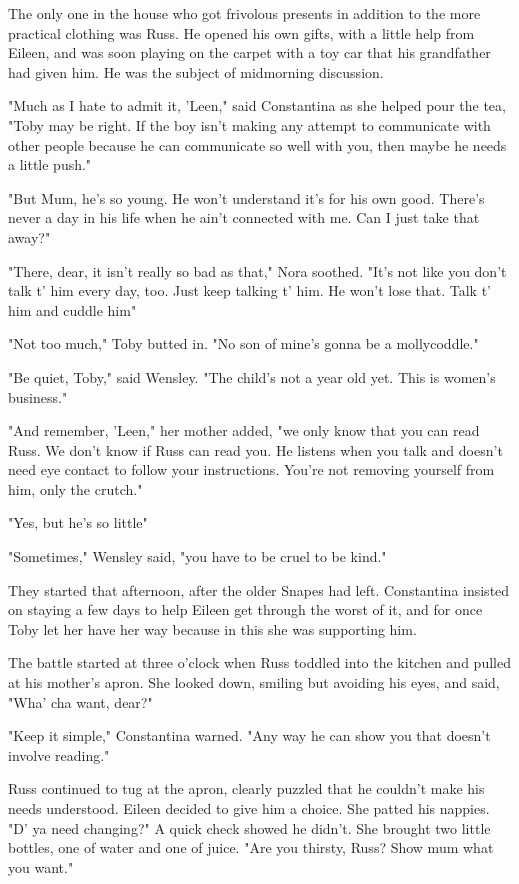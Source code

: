 The only one in the house who got frivolous presents in addition to the more practical clothing was Russ. He opened his own gifts, with a little help from Eileen, and was soon playing on the carpet with a toy car that his grandfather had given him. He was the subject of midmorning discussion.

"Much as I hate to admit it, 'Leen," said Constantina as she helped pour the tea, "Toby may be right. If the boy isn't making any attempt to communicate with other people because he can communicate so well with you, then maybe he needs a little push."

"But Mum, he's so young. He won't understand it's for his own good. There's never a day in his life when he ain't connected with me. Can I just take that away?"

"There, dear, it isn't really so bad as that," Nora soothed. "It's not like you don't talk t' him every day, too. Just keep talking t' him. He won't lose that. Talk t' him and cuddle him{\el}"

"Not too much," Toby butted in. "No son of mine's gonna be a mollycoddle."

"Be quiet, Toby," said Wensley. "The child's not a year old yet. This is women's business."

"And remember, 'Leen," her mother added, "we only know that you can read Russ. We don't know if Russ can read you. He listens when you talk and doesn't need eye contact to follow your instructions. You're not removing yourself from him, only the crutch."

"Yes, but he's so little{\el}"

"Sometimes," Wensley said, "you have to be cruel to be kind."

They started that afternoon, after the older Snapes had left. Constantina insisted on staying a few days to help Eileen get through the worst of it, and for once Toby let her have her way because in this she was supporting him.

The battle started at three o'clock when Russ toddled into the kitchen and pulled at his mother's apron. She looked down, smiling but avoiding his eyes, and said, "Wha' cha want, dear?"

"Keep it simple," Constantina warned. "Any way he can show you that doesn't involve reading."

Russ continued to tug at the apron, clearly puzzled that he couldn't make his needs understood. Eileen decided to give him a choice. She patted his nappies. "D' ya need changing?" A quick check showed he didn't. She brought two little bottles, one of water and one of juice. "Are you thirsty, Russ? Show mum what you want."

